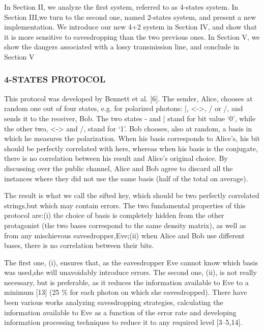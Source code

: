 In Section II, we analyze the first system, referred to as 4-states system. In Section III,we turn to the second one, named 2-states system, and present a new implementation.
We introduce our new 4+2 system in Section IV, and show that it is more sensitive to eavesdropping than the two previous ones. In Section V, we show the dangers associated with a lossy transmission line, and conclude in Section V

\subsubsection*{4-STATES PROTOCOL}

This protocol was developed by Bennett et al. [6]. The sender, Alice, chooses at random one out of four states, e.g. for polarized photons: |, <->, / or /, and sends it to the receiver, Bob. The two states - and | stand for bit value ‘0’, while the other two, <-> and /, stand for ‘1’. Bob chooses, also at random, a basis in which he measures the polarization. When his basis corresponds to Alice’s, his bit should be perfectly correlated with hers, whereas when his basis is the conjugate, there is no correlation between his result and Alice’s original choice. By discussing over the public channel, Alice and Bob agree to discard all the instances where they did not use the same basis (half of the total on average).

The result is what we call the sifted key, which should be two perfectly correlated strings,but which may contain errors. The two fundamental properties of this protocol are:(i) the choice of basis is completely hidden from the other protagonist (the two bases correspond to the same density matrix), as well as from any mischievous eavesdropper,Eve;(ii) when Alice and Bob use different bases, there is no correlation between their bits.

The first one, (i), ensures that, as the eavesdropper Eve cannot know which basis was used,she will unavoidably introduce errors. The second one, (ii), is not really necessary, but is preferable, as it reduces the information available to Eve to a minimum [13] (25 \% for each photon on which she eavesdropped). There have been various works analyzing eavesdropping strategies, calculating the information available to Eve as a function of the error rate and developing information processing techniques to reduce it to any required level [3–5,14].

